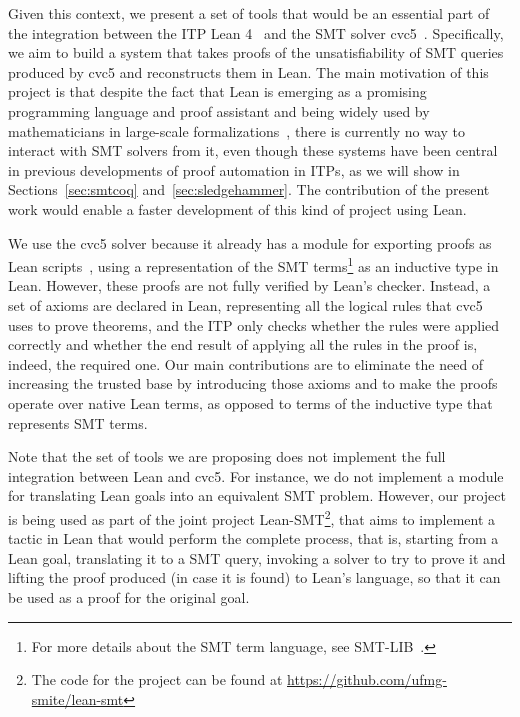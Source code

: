 Given this context, we present a set of tools that would be an essential
part of the integration between the ITP Lean 4~\cite{lean} and the SMT solver cvc5~\cite{cvc5}.
%
Specifically, we aim to build a system that takes proofs of the unsatisfiability of
SMT queries produced by cvc5 and reconstructs them in Lean.
%
The main motivation of this project is that despite the fact that Lean is
emerging as a promising programming language and proof assistant and being
widely used by mathematicians in large-scale
formalizations~\cite{mathlib, scholze}, there is currently no way to
interact with SMT solvers from it, even though these systems have been
central in previous developments of proof automation in ITPs, as we will show in Sections~\ref{sec:smtcoq}
and~\ref{sec:sledgehammer}. The contribution of the present work
would enable a faster development of this kind of project using Lean.

We use the cvc5 solver because it already has a module for exporting proofs as
Lean scripts~\cite{Barbosa2022}, using a representation of the SMT terms\footnote{For more details
about the SMT term language, see SMT-LIB~\cite{smtlib}.} as an inductive type in Lean.
However, these proofs are not fully verified by Lean's checker. Instead, a set of
axioms are declared in Lean, representing all the logical rules that cvc5 uses to prove
theorems, and the ITP only checks whether the rules were applied correctly and whether
the end result of applying all the rules in the proof is, indeed, the required one.
Our main contributions are to eliminate the need of increasing the trusted base by introducing
those axioms and to make the proofs operate over native Lean terms, as opposed to terms
of the inductive type that represents SMT terms.

Note that the set of tools we are proposing does not implement the full integration
between Lean and cvc5. For instance, we do not implement a module for translating
Lean goals into an equivalent SMT problem. However, our project is being used
as part of the joint project Lean-SMT\footnote{The code for the project can be found at \url{https://github.com/ufmg-smite/lean-smt}}, that aims to implement a tactic in Lean
that would perform the complete process, that is, starting from a Lean goal, translating it to a SMT query, invoking a solver to try to prove it and lifting the proof produced (in case it is found) to Lean's language, so that it can be used as a proof for the original goal.
